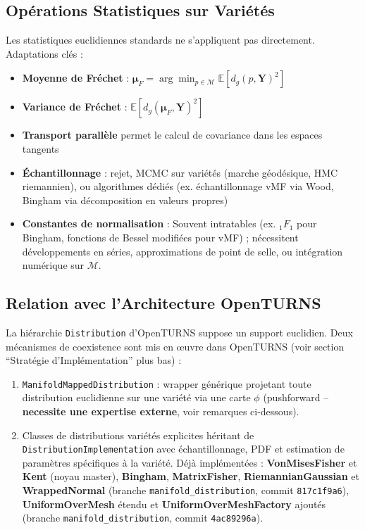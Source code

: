 \documentclass[11pt,a4paper]{article}
\begin{document}
\subsection{Opérations Statistiques sur Variétés}
Les statistiques euclidiennes standards ne s'appliquent pas directement. Adaptations clés :

\begin{itemize}
    \item \textbf{Moyenne de Fréchet} : $\boldsymbol{\mu}_F = \arg\min_{p \in \mathcal{M}} \mathbb{E}[d_g(p, \mathbf{Y})^2]$
    \item \textbf{Variance de Fréchet} : $\mathbb{E}[d_g(\boldsymbol{\mu}_F, \mathbf{Y})^2]$
    \item \textbf{Transport parallèle} permet le calcul de covariance dans les espaces tangents
    \item \textbf{Échantillonnage} : rejet, MCMC sur variétés (marche géodésique, HMC riemannien), ou algorithmes dédiés (ex. échantillonnage vMF via Wood, Bingham via décomposition en valeurs propres)
    \item \textbf{Constantes de normalisation} : Souvent intratables (ex. ${}_1F_1$ pour Bingham, fonctions de Bessel modifiées pour vMF) ; nécessitent développements en séries, approximations de point de selle, ou intégration numérique sur $\mathcal{M}$.
\end{itemize}

\subsection{Relation avec l'Architecture OpenTURNS}
La hiérarchie \texttt{Distribution} d'OpenTURNS suppose un support euclidien. Deux mécanismes de coexistence sont mis en œuvre dans OpenTURNS (voir section ``Stratégie d'Implémentation'' plus bas) :

\begin{enumerate}
    \item \texttt{ManifoldMappedDistribution} : wrapper générique projetant toute distribution euclidienne sur une variété via une carte $\phi$ (pushforward -- \textbf{necessite une expertise externe}, voir remarques ci-dessous).
    \item Classes de distributions variétés explicites héritant de \texttt{DistributionImplementation} avec échantillonnage, PDF et estimation de paramètres spécifiques à la variété. Déjà implémentées : \textbf{VonMisesFisher} et \textbf{Kent} (noyau master), \textbf{Bingham}, \textbf{MatrixFisher}, \textbf{RiemannianGaussian} et \textbf{WrappedNormal} (branche \texttt{manifold\_distribution}, commit \texttt{817c1f9a6}), \textbf{UniformOverMesh} étendu et \textbf{UniformOverMeshFactory} ajoutés (branche \texttt{manifold\_distribution}, commit \texttt{4ac89296a}).
\end{enumerate}
\end{document}
